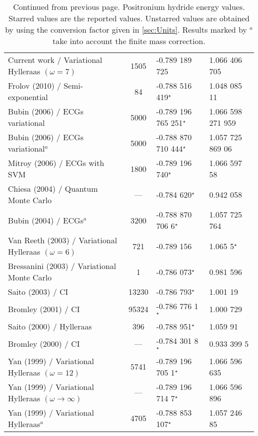 \documentclass[Dissertation.tex]{subfiles}
\begin{document}
{\begin{center}
\begin{longtable}{l c l l}
	\caption[Positronium hydride energy values]{Continued from previous page. Positronium hydride energy values. Starred values are the reported values. Unstarred values are obtained by using the conversion factor given in \cref{sec:Units}. Results marked by $^a$ take into account the finite mass correction.}
	\endlastfoot
	\rowcolors{2}{gray!15}{white}
	Current work / Variational Hylleraas $(\omega = 7)$ & 1505 & -0.789 189 725 & 1.066 406 705 \\
	Frolov (2010) \cite{Frolov2010} / Semi-exponential & 84 & -0.788 516 419$^\star$ & 1.048 085 11 \\
	Bubin (2006) \cite{Bubin2006} / ECGs variational & 5000 & -0.789 196 765 251$^\star$ & 1.066 598 271 959 \\
	Bubin (2006) \cite{Bubin2006} / ECGs variational$^a$ & 5000 & -0.788 870 710 444$^\star$ & 1.057 725 869 06 \\
	Mitroy (2006) \cite{Mitroy2006} / ECGs with SVM & 1800 & -0.789 196 740$^\star$ & 1.066 597 58 \\
	Chiesa (2004) \cite{Chiesa2004} / Quantum Monte Carlo & --- & -0.784 620$^\star$ & 0.942 058 \\
	Bubin (2004) \cite{Bubin2004} / ECGs$^a$ & 3200 & -0.788 870 706 6$^\star$ & 1.057 725 764 \\
	Van Reeth (2003) \cite{VanReeth2003} / Variational Hylleraas $(\omega = 6)$ & 721 & -0.789 156 & 1.065 5$^\star$ \\
	Bressanini (2003) \cite{Bressanini2003} / Variational Monte Carlo & 1 & -0.786 073$^\star$ & 0.981 596 \\
	Saito (2003) \cite{Saito2003a} / CI & 13230 & -0.786 793$^\star$ & 1.001 19 \\
	Bromley (2001) \cite{Bromley2001} / CI & 95324 & -0.786 776 1$^\star$ & 1.000 729 \\
	Saito (2000) \cite{Saito2000} / Hylleraas & 396 & -0.788 951$^\star$ & 1.059 91 \\
	Bromley (2000) \cite{Bromley2000} / CI & --- & -0.784 301 8$^\star$ & 0.933 399 5 \\
	Yan (1999) \cite{Yan1999} / Variational Hylleraas $(\omega = 12)$ & 5741 & -0.789 196 705 1$^\star$ & 1.066 596 635 \\
	Yan (1999) \cite{Yan1999} / Variational Hylleraas $(\omega \rightarrow \infty)$ & --- & -0.789 196 714 7$^\star$ & 1.066 596 896 \\
	Yan (1999) \cite{Yan1999a} / Variational Hylleraas$^a$ & 4705 & -0.788 853 107$^\star$ & 1.057 246 85 \\

\end{longtable}
\end{center}}
\end{document}
